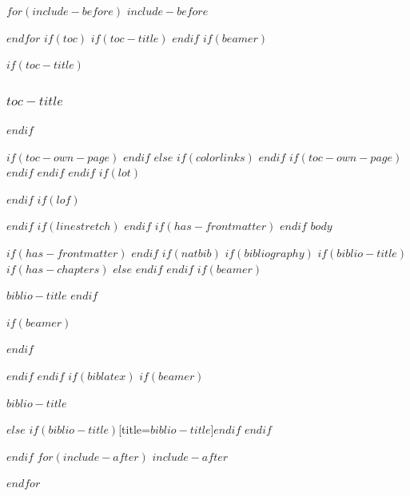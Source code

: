 \documentclass[
$if(fontsize)$
  $fontsize$,
$endif$
$if(lang)$
  $babel-lang$,
$endif$
$if(papersize)$
  $papersize$paper,
$else$
  paper=a4,
$endif$
$if(beamer)$
  ignorenonframetext,
$if(handout)$
  handout,
$endif$
$if(aspectratio)$
  aspectratio=$aspectratio$,
$endif$
$endif$
$for(classoption)$
  $classoption$$sep$,
$endfor$
,captions=tableheading
]{$if(beamer)$$documentclass$$else$$if(book)$scrbook$else$scrartcl$endif$$endif$}
\newif\ifbibliography
\begin{document}
$for(include-before)$
$include-before$

$endfor$
$if(toc)$
$if(toc-title)$
\renewcommand*\contentsname{$toc-title$}
$endif$
$if(beamer)$
\begin{frame}
$if(toc-title)$
  \frametitle{$toc-title$}
$endif$
  \tableofcontents[hideallsubsections]
\end{frame}
$if(toc-own-page)$
\newpage
$endif$
$else$
{
$if(colorlinks)$
\hypersetup{linkcolor=$if(toccolor)$$toccolor$$else$$endif$}
$endif$
\setcounter{tocdepth}{$if(toc-depth)$$toc-depth$$else$3$endif$}
\tableofcontents
$if(toc-own-page)$
\newpage
$endif$
}
$endif$
$endif$
$if(lot)$
\listoftables
$endif$
$if(lof)$
\listoffigures
$endif$
$if(linestretch)$
$endif$
$if(has-frontmatter)$
\mainmatter
$endif$
$body$

$if(has-frontmatter)$
\backmatter
$endif$
$if(natbib)$
$if(bibliography)$
$if(biblio-title)$
$if(has-chapters)$
\renewcommand\bibname{$biblio-title$}
$else$
\renewcommand\refname{$biblio-title$}
$endif$
$endif$
$if(beamer)$
\begin{frame}[allowframebreaks]{$biblio-title$}
  \bibliographytrue
$endif$
  
$if(beamer)$
\end{frame}
$endif$

$endif$
$endif$
$if(biblatex)$
$if(beamer)$
\begin{frame}[allowframebreaks]{$biblio-title$}
  \bibliographytrue
  \printbibliography[heading=none]
\end{frame}
$else$
\printbibliography$if(biblio-title)$[title=$biblio-title$]$endif$
$endif$

$endif$
$for(include-after)$
$include-after$

$endfor$
\end{document}
